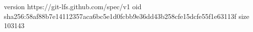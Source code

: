 version https://git-lfs.github.com/spec/v1
oid sha256:58af88b7e14112357aca6bc5e1d0fcbb9e36dd43b258cfe15dcfe55f1e63113f
size 103143
